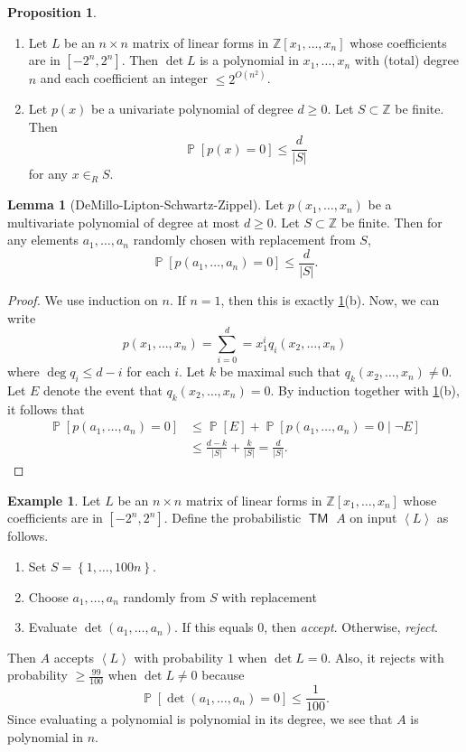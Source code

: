 \documentclass[10pt,letterpaper,cm]{nupset}
\theoremstyle{definition}
\newtheorem{exmp}[definition]{Example}
\theoremstyle{theorem}
\newtheorem{lemma}[definition]{Lemma}
\newtheorem{prop}[definition]{Proposition}
\theoremstyle{remark}
\newcommand{\Z}{\mathbb Z}
\newcommand{\1}{\mathbf{1}}
\newcommand{\0}{\vec 0}
\DeclareMathOperator{\pr}{\mathbb{P}}
\DeclareMathOperator{\TM}{\mathsf{TM}}
\begin{document}
\begin{prop}\label{poly} $ $
\begin{enumerate}[label=(\alph*)]
\item Let $L$ be an $n\times n$ matrix of linear forms in $\Z[x_1, \ldots, x_n]$ whose coefficients are in $\left[{-2}^n, 2^n\right]$. Then $\det{L}$ is a polynomial in $x_1, \ldots, x_n$ with (total) degree $n$ and each coefficient an integer $\leq 2^{O\left(n^2\right)}$.
\item Let $p(x)$ be a univariate polynomial of degree $d \geq 0$. Let $S\subset \Z$ be finite. Then $$\pr\left[p(x) =0\right] \leq \frac{d}{\left\lvert{S}\right\rvert}$$ for any $x\in_R S$.
\end{enumerate}
\end{prop}

\begin{lemma}[DeMillo-Lipton-Schwartz-Zippel]\label{Dem}
Let $p(x_1, \ldots, x_n)$ be a multivariate polynomial of degree at most $d\geq 0$. Let $S \subset \Z$ be finite. Then for any elements $a_1, \ldots, a_n$ randomly chosen with replacement from $S$, $$\pr\left[p(a_1, \ldots, a_n) =0\right] \leq \frac{d}{\left\lvert{S}\right\rvert}.$$
\end{lemma}
\begin{proof}
We use induction on $n$. If $n=1$, then this is exactly \cref{poly}(b). Now, we can write $$p(x_1, \ldots, x_n) = \sum_{i=0}^d = x_1^i q_i(x_2, \ldots, x_n)$$ where $\deg{q_i} \leq d-i$ for each $i$. Let $k$ be maximal such that $q_k(x_2, \ldots, x_n) \ne 0$. Let $E$ denote the event that $q_k(x_2, \ldots, x_n) =0$. 
By induction together with \cref{poly}(b), it follows that  
\begin{align*} \pr\left[p(a_1, \ldots, a_n) =0\right] & \leq \pr[E] + \pr\left[p(a_1, \ldots, a_n) =0 \mid \neg{E}\right]
\\ & \leq \frac{d-k}{\left\lvert{S}\right\rvert} + \frac{k}{\left\lvert{S}\right\rvert} = \frac{d}{\left\lvert{S}\right\rvert}.
\end{align*}
\end{proof}

\begin{exmp}\label{matrix}
Let $L$ be an $n \times n$ matrix of linear forms in $\Z[x_1, \ldots, x_n]$ whose coefficients are in $\left[{-2}^n, 2^n\right]$. Define the probabilistic $\TM$ $A$ on input $\left\langle L \right\rangle$ as follows. 
\begin{enumerate}
\item Set $S = \left\{1, \ldots, 100n\right\}$.
\item Choose $a_1, \ldots, a_n$ randomly from $S$ with replacement
\item Evaluate $\det(a_1, \ldots, a_n)$.  If this equals $0$, then \textit{accept}. Otherwise, \textit{reject}.
\end{enumerate}
Then $A$ accepts $\left\langle L \right\rangle$ with probability $1$ when $\det{L} = 0$. Also, it rejects with probability $\geq \frac{99}{100}$ when $\det{L} \ne 0$ because $$\pr\left[\det(a_1, \ldots, a_n) =0\right] \leq \frac{1}{100}.$$ Since evaluating a polynomial is polynomial in its degree, we see that $A$ is polynomial in $n$.
\end{exmp}
\end{document}
